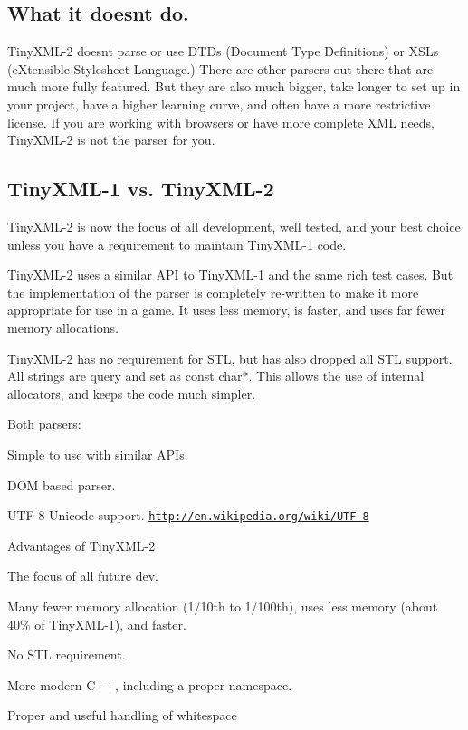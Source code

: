 \subsection*{What it doesn\textquotesingle{}t do. }

Tiny\+X\+M\+L-\/2 doesn\textquotesingle{}t parse or use D\+T\+Ds (Document Type Definitions) or X\+S\+Ls (e\+Xtensible Stylesheet Language.) There are other parsers out there that are much more fully featured. But they are also much bigger, take longer to set up in your project, have a higher learning curve, and often have a more restrictive license. If you are working with browsers or have more complete X\+ML needs, Tiny\+X\+M\+L-\/2 is not the parser for you.

\subsection*{Tiny\+X\+M\+L-\/1 vs. Tiny\+X\+M\+L-\/2 }

Tiny\+X\+M\+L-\/2 is now the focus of all development, well tested, and your best choice unless you have a requirement to maintain Tiny\+X\+M\+L-\/1 code.

Tiny\+X\+M\+L-\/2 uses a similar A\+PI to Tiny\+X\+M\+L-\/1 and the same rich test cases. But the implementation of the parser is completely re-\/written to make it more appropriate for use in a game. It uses less memory, is faster, and uses far fewer memory allocations.

Tiny\+X\+M\+L-\/2 has no requirement for S\+TL, but has also dropped all S\+TL support. All strings are query and set as \textquotesingle{}const char$\ast$\textquotesingle{}. This allows the use of internal allocators, and keeps the code much simpler.

Both parsers\+:


\begin{DoxyEnumerate}
\item Simple to use with similar A\+P\+Is.
\item D\+OM based parser.
\item U\+T\+F-\/8 Unicode support. \href{http://en.wikipedia.org/wiki/UTF-8}{\tt http\+://en.\+wikipedia.\+org/wiki/\+U\+T\+F-\/8}
\end{DoxyEnumerate}

Advantages of Tiny\+X\+M\+L-\/2


\begin{DoxyEnumerate}
\item The focus of all future dev.
\item Many fewer memory allocation (1/10th to 1/100th), uses less memory (about 40\% of Tiny\+X\+M\+L-\/1), and faster.
\item No S\+TL requirement.
\item More modern C++, including a proper namespace.
\item Proper and useful handling of whitespace
\end{DoxyEnumerate}

